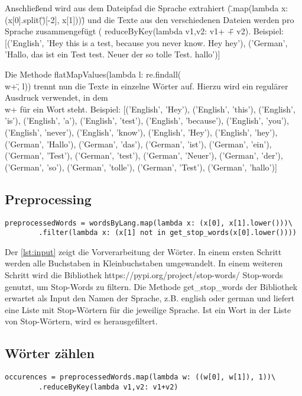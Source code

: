 \documentclass[chapterprefix=true, 12pt, a4paper, oneside, parskip=half, listof=totoc, bibliography=totoc, numbers=noendperiod]{scrbook}
\begin{document}
Anschließend wird aus dem Dateipfad die Sprache extrahiert (\".map(lambda x: (x[0].split(\"\/\")[-2], x[1]))\") und die Texte aus den verschiedenen Dateien werden pro Sprache zusammengefügt (  reduceByKey(lambda v1,v2: v1+ \" \" + v2). 
Beispiel: [('English', 'Hey this is a test, because you never know. Hey hey'),
 ('German', 'Hallo, das ist ein Test test. Neuer der so tolle Test. hallo')]
 
 
Die Methode flatMapValues(lambda l: re.findall(\"\\w+\", l)) trennt nun die Texte in einzelne Wörter auf. Hierzu wird ein regulärer Ausdruck verwendet, in dem \\w+ für ein Wort steht. 
Beispiel: [('English', 'Hey'),
 ('English', 'this'),
 ('English', 'is'),
 ('English', 'a'),
 ('English', 'test'),
 ('English', 'because'),
 ('English', 'you'),
 ('English', 'never'),
 ('English', 'know'),
 ('English', 'Hey'),
 ('English', 'hey'),
 ('German', 'Hallo'),
 ('German', 'das'),
 ('German', 'ist'),
 ('German', 'ein'),
 ('German', 'Test'),
 ('German', 'test'),
 ('German', 'Neuer'),
 ('German', 'der'),
 ('German', 'so'),
 ('German', 'tolle'),
 ('German', 'Test'),
 ('German', 'hallo')]
 
 \subsection{Preprocessing}
 \begin{lstlisting}[caption={Vorbereitung}, captionpos=b, label={lst:prep}]
 preprocessedWords = wordsByLang.map(lambda x: (x[0], x[1].lower()))\
        .filter(lambda x: (x[1] not in get_stop_words(x[0].lower())))
\end{lstlisting}

Der \autoref{lst:input} zeigt die Vorverarbeitung der Wörter. In einem ersten Schritt werden alle Buchstaben in Kleinbuchstaben umgewandelt. In einem weiteren Schritt wird die Bibliothek https://pypi.org/project/stop-words/ Stop-words genutzt, um Stop-Words zu filtern. Die Methode get\_stop\_words der Bibliothek erwartet als Input den Namen der Sprache, z.B. english oder german und liefert eine Liste mit Stop-Wörtern für die jeweilige Sprache. Ist ein Wort in der Liste von Stop-Wörtern, wird es herausgefiltert.


\subsection{Wörter zählen}

 \begin{lstlisting}[caption={Vorbereitung}, captionpos=b, label={lst:countWords}]
occurences = preprocessedWords.map(lambda w: ((w[0], w[1]), 1))\
        .reduceByKey(lambda v1,v2: v1+v2)
\end{lstlisting}
\end{document}
